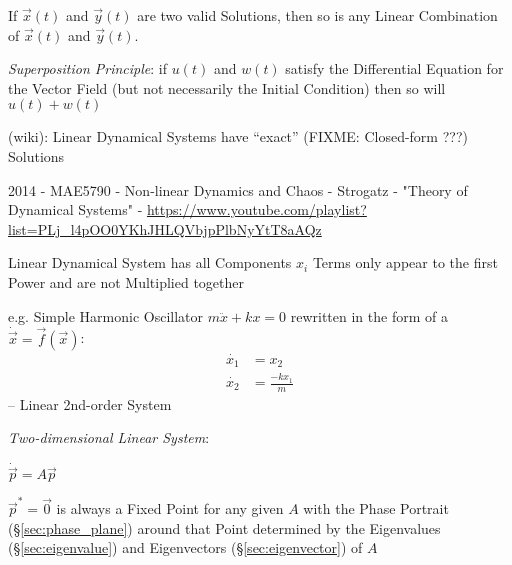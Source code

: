 If $\vec{x}(t)$ and $\vec{y}(t)$ are two valid Solutions, then so is any Linear
Combination of $\vec{x}(t)$ and $\vec{y}(t)$.

\emph{Superposition Principle}: if $u(t)$ and $w(t)$ satisfy the Differential
Equation for the Vector Field (but not necessarily the Initial Condition) then
so will $u(t) + w(t)$

(wiki): Linear Dynamical Systems have ``exact'' (FIXME: Closed-form ???)
Solutions

\asterism

2014 - MAE5790 - Non-linear Dynamics and Chaos - Strogatz - "Theory of
Dynamical Systems" -
\url{https://www.youtube.com/playlist?list=PLj_l4pOO0YKhJHLQVbjpPlbNyYtT8aAQz}

Linear Dynamical System has all Components $x_i$ Terms only appear to the first
Power and are not Multiplied together

e.g. Simple Harmonic Oscillator $m\ddot{x} + kx = 0$
rewritten in the form of a $\dot{\vec{x}} = \vec{f}(\vec{x})$:
\begin{align*}
  \dot{x_1} & = x_2 \\
  \dot{x_2} & = \frac{-kx_1}{m}
\end{align*}
-- Linear 2nd-order System

\emph{Two-dimensional Linear System}:

$\dot{\vec{p}} = A\vec{p}$

$\vec{p}^* = \vec{0}$ is always a Fixed Point for any given $A$ with the Phase
Portrait (\S\ref{sec:phase_plane}) around that Point determined by the
Eigenvalues (\S\ref{sec:eigenvalue}) and Eigenvectors (\S\ref{sec:eigenvector})
of $A$

